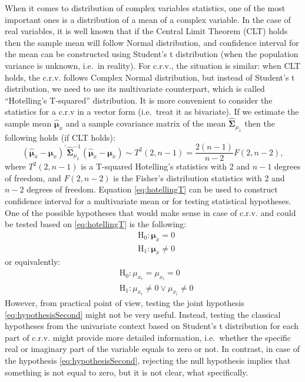 \documentclass[
]{book}
\begin{document}
When it comes to distribution of complex variables statistics, one of the most important ones is a distribution of a mean of a complex variable. In the case of real variables, it is well known that if the Central Limit Theorem (CLT) holds then the sample mean will follow Normal distribution, and confidence interval for the mean can be constructed using Student's t distribution (when the population variance is unknown, i.e.~in reality). For c.r.v., the situation is similar: when CLT holds, the c.r.v. follows Complex Normal distribution, but instead of Student's t distribution, we need to use its multivariate counterpart, which is called ``Hotelling's T-squared'' distribution. It is more convenient to consider the statistics for a c.r.v in a vector form (i.e.~treat it as bivariate). If we estimate the sample mean \(\hat{\boldsymbol{\mu}}_x\) and a sample covariance matrix of the mean \(\hat{\boldsymbol{\Sigma}}_{\mu_{x}}\) then the following holds (if CLT holds):
\begin{equation}
    (\hat{\boldsymbol{\mu}}_x - \boldsymbol{\mu}_x)^\prime \hat{\boldsymbol{\Sigma}}_{\mu_{x}}^{-1} (\hat{\boldsymbol{\mu}}_x - \boldsymbol{\mu}_x) \sim T^2(2, n-1) = \frac{2(n-1)}{n-2} F(2, n-2),
    \label{eq:hotellingT}
\end{equation}
where \(T^2(2, n-1)\) is a T-squared Hotelling's statistics with 2 and \(n-1\) degrees of freedom, and \(F(2, n-2)\) is the Fisher's distribution statistics with 2 and \(n-2\) degrees of freedom. Equation \eqref{eq:hotellingT} can be used to construct confidence interval for a multivariate mean or for testing statistical hypotheses. One of the possible hypotheses that would make sense in case of c.r.v. and could be tested based on \eqref{eq:hotellingT} is the following:
\begin{equation}
    \begin{aligned}
        & \mathrm{H}_0: \boldsymbol{\mu}_x = 0 \\
        & \mathrm{H}_1: \boldsymbol{\mu}_x \neq 0
    \end{aligned}
    \label{eq:hypothesisFirst}
\end{equation}
or equivalently:
\begin{equation}
    \begin{aligned}
        & \mathrm{H}_0: \mu_{x_r} = \mu_{x_i} = 0 \\
        & \mathrm{H}_1: \mu_{x_r} \neq 0 \vee \mu_{x_i} \neq 0
    \end{aligned}
    \label{eq:hypothesisSecond}
\end{equation}
However, from practical point of view, testing the joint hypothesis \eqref{eq:hypothesisSecond} might not be very useful. Instead, testing the classical hypotheses from the univariate context based on Student's t distribution for each part of c.r.v. might provide more detailed information, i.e.~whether the specific real or imaginary part of the variable equals to zero or not. In contrast, in case of the hypothesis \eqref{eq:hypothesisSecond}, rejecting the null hypothesis implies that something is not equal to zero, but it is not clear, what specifically.
\end{document}

